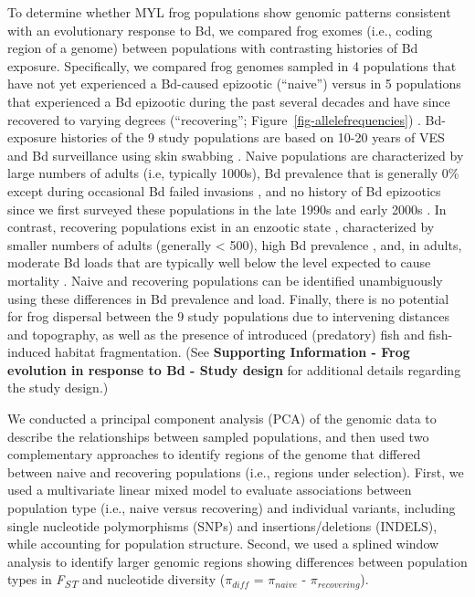 \documentclass[
  letterpaper,
  DIV=11,
  numbers=noendperiod]{scrartcl}
\begin{document}
To determine whether MYL frog populations show genomic patterns
consistent with an evolutionary response to Bd, we compared frog exomes
(i.e., coding region of a genome) between populations with contrasting
histories of Bd exposure. Specifically, we compared frog genomes sampled
in 4 populations that have not yet experienced a Bd-caused epizootic
(``naive'') \citep{zhou2015} versus in 5 populations that experienced a
Bd epizootic during the past several decades and have since recovered to
varying degrees (``recovering''; Figure~\ref{fig-allelefrequencies})
\citep{knapp2016, vredenburg2010}. Bd-exposure histories of the 9 study
populations are based on 10-20 years of VES and Bd surveillance using
skin swabbing \citep[e.g.,][]{knapp2016, zhou2015, wilber2022}. Naive
populations are characterized by large numbers of adults (i.e, typically
1000s), Bd prevalence that is generally 0\% except during occasional Bd
failed invasions \citep[during which Bd loads remain very
low,][]{wilber2022}, and no history of Bd epizootics since we first
surveyed these populations in the late 1990s and early 2000s
\citep{zhou2015}. In contrast, recovering populations exist in an
enzootic state \citep{briggs2010}, characterized by smaller numbers of
adults (generally \textless{} 500), high Bd prevalence \citep[often
\textgreater{} 80\%,][]{knapp2011}, and, in adults, moderate Bd loads
that are typically well below the level expected to cause mortality
\citep{vredenburg2010}. Naive and recovering populations can be
identified unambiguously using these differences in Bd prevalence and
load. Finally, there is no potential for frog dispersal between the 9
study populations due to intervening distances and topography, as well
as the presence of introduced (predatory) fish and fish-induced habitat
fragmentation. (See \textbf{Supporting Information - Frog evolution in
response to Bd - Study design} for additional details regarding the
study design.)

We conducted a principal component analysis (PCA) of the genomic data to
describe the relationships between sampled populations, and then used
two complementary approaches to identify regions of the genome that
differed between naive and recovering populations (i.e., regions under
selection). First, we used a multivariate linear mixed model to evaluate
associations between population type (i.e., naive versus recovering) and
individual variants, including single nucleotide polymorphisms (SNPs)
and insertions/deletions (INDELS), while accounting for population
structure. Second, we used a splined window analysis to identify larger
genomic regions showing differences between population types in
\emph{F\textsubscript{ST}} and nucleotide diversity (\(\pi_{diff}\) =
\(\pi_{naive}\) - \(\pi_{recovering}\)).
\end{document}

